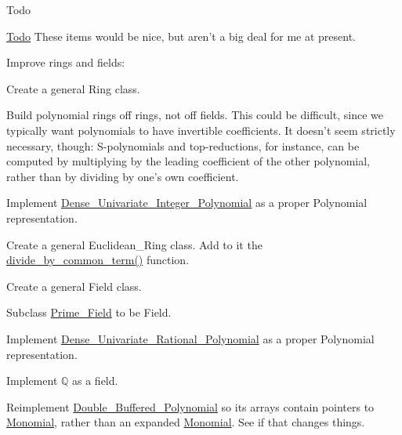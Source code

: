\begin{DoxyRefDesc}{Todo}
\item[\hyperlink{todo__todo000002}{Todo}]These items would be nice, but aren't a big deal for me at present.
\begin{DoxyItemize}
\item Improve rings and fields\+:
\begin{DoxyItemize}
\item Create a general {\ttfamily Ring} class.
\begin{DoxyItemize}
\item Build polynomial rings off rings, not off fields. This could be difficult, since we typically want polynomials to have invertible coefficients. It doesn't seem strictly necessary, though\+: S-\/polynomials and top-\/reductions, for instance, can be computed by multiplying by the leading coefficient of the other polynomial, rather than by dividing by one's own coefficient.
\item Implement \hyperlink{group__polygroup_class_dense___univariate___integer___polynomial}{Dense\+\_\+\+Univariate\+\_\+\+Integer\+\_\+\+Polynomial} as a proper {\ttfamily Polynomial} representation.
\item Create a general {\ttfamily Euclidean\+\_\+\+Ring} class. Add to it the \hyperlink{group__utils_gaefe33f79de88accbc6f455e91dab9288}{divide\+\_\+by\+\_\+common\+\_\+term()} function.
\end{DoxyItemize}
\item Create a general {\ttfamily Field} class.
\begin{DoxyItemize}
\item Subclass \hyperlink{group___fields_group_class_prime___field}{Prime\+\_\+\+Field} to be {\ttfamily Field}.
\item Implement \hyperlink{group__polygroup_class_dense___univariate___rational___polynomial}{Dense\+\_\+\+Univariate\+\_\+\+Rational\+\_\+\+Polynomial} as a proper {\ttfamily Polynomial} representation.
\item Implement $\mathbb Q$ as a field.
\end{DoxyItemize}
\end{DoxyItemize}
\item Reimplement \hyperlink{group__polygroup_class_double___buffered___polynomial}{Double\+\_\+\+Buffered\+\_\+\+Polynomial} so its arrays contain pointers to \hyperlink{group__polygroup_class_monomial}{Monomial}, rather than an expanded \hyperlink{group__polygroup_class_monomial}{Monomial}. See if that changes things.

\end{DoxyItemize}
\end{DoxyRefDesc}
